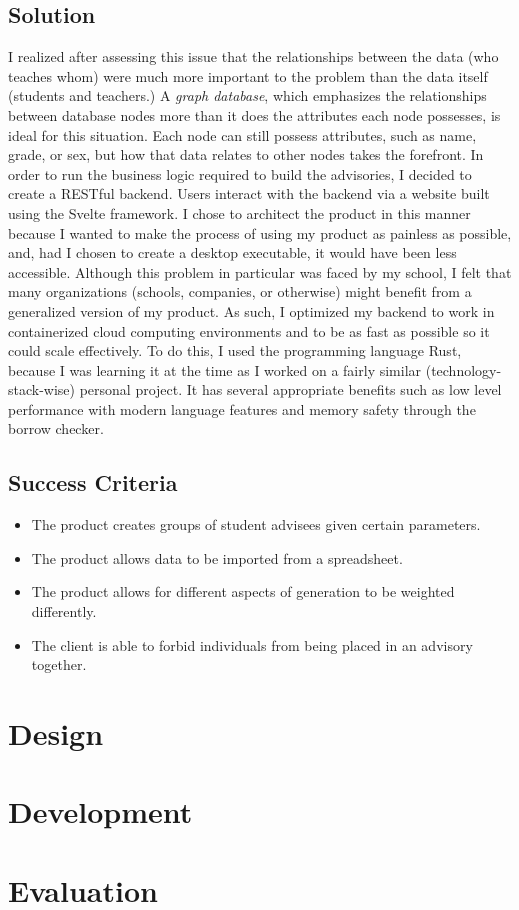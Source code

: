 \documentclass{paper}
\begin{document}
\subsection{Solution}
I realized after assessing this issue that the relationships between the data (who teaches whom) were much more important to the problem than the data itself (students and teachers.)
A \textit{graph database}, which emphasizes the relationships between database nodes more than it does the attributes each node possesses, is ideal for this situation.
Each node can still possess attributes, such as name, grade, or sex, but how that data relates to other nodes takes the forefront.
In order to run the business logic required to build the advisories, I decided to create a RESTful backend.
Users interact with the backend via a website built using the Svelte framework.
I chose to architect the product in this manner because I wanted to make the process of using my product as painless as possible, and, had I chosen to create a desktop executable, it would have been less accessible.
Although this problem in particular was faced by my school, I felt that many organizations (schools, companies, or otherwise) might benefit from a generalized version of my product.
As such, I optimized my backend to work in containerized cloud computing environments and to be as fast as possible so it could scale effectively.
To do this, I used the programming language Rust, because I was learning it at the time as I worked on a fairly similar (technology-stack-wise) personal project.
It has several appropriate benefits such as low level performance with modern language features and memory safety through the borrow checker.

\subsection{Success Criteria}
\begin{itemize}
  \item The product creates groups of student advisees given certain parameters.
  \item The product allows data to be imported from a spreadsheet.
  \item The product allows for different aspects of generation to be weighted differently.
  \item The client is able to forbid individuals from being placed in an advisory together.
\end{itemize}

\section{Design}
\label{sec:design}

\section{Development}
\label{sec:develop}

\section{Evaluation}
\label{sec:eval}

\label{mylastpage}
%
\newpage
{}
\listoffigures
\vspace{1cm}
\listofsnippets
\vspace{1cm}
{}
\printbibliography
\thispagestyle{frontorback}
\end{document}
